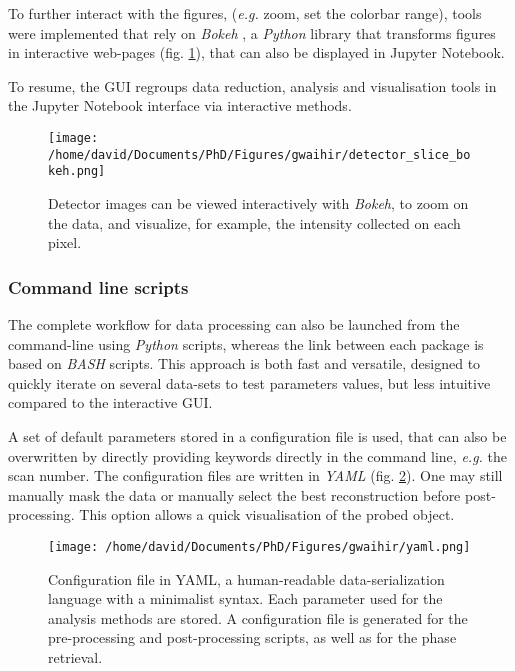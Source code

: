 To further interact with the figures, (\textit{e.g.} zoom, set the colorbar range), tools were implemented that rely on \textit{Bokeh} \parencite{Bokeh}, a \textit{Python} library that transforms figures in interactive web-pages (fig. \ref{fig:BokehDetector}), that can also be displayed in Jupyter Notebook.

To resume, the GUI regroups data reduction, analysis and visualisation tools in the Jupyter Notebook interface via interactive methods.

\begin{figure}[!htb]
    \centering
    \texttt{[image: /home/david/Documents/PhD/Figures/gwaihir/detector\_slice\_bokeh.png]}
    \caption{Detector images can be viewed interactively with \textit{Bokeh}, to zoom on the data, and visualize, for example, the intensity collected on each pixel.}
    \label{fig:BokehDetector}
\end{figure}

\subsubsection{Command line scripts}

The complete workflow for data processing can also be launched from the command-line using \textit{Python} scripts, whereas the link between each package is based on \textit{BASH} scripts.
This approach is both fast and versatile, designed to quickly iterate on several data-sets to test parameters values, but less intuitive compared to the interactive GUI.

A set of default parameters stored in a configuration file is used, that can also be overwritten by directly providing keywords directly in the command line, \textit{e.g.} the scan number.
The configuration files are written in \textit{YAML} (fig. \ref{fig:YAML_file}).
One may still manually mask the data or manually select the best reconstruction before post-processing.
This option allows a quick visualisation of the probed object.

\begin{figure}[!htb]
    \centering
    \texttt{[image: /home/david/Documents/PhD/Figures/gwaihir/yaml.png]}
    \caption{
    Configuration file in YAML, a human-readable data-serialization language with a minimalist syntax.
    Each parameter used for the analysis methods are stored.
    A configuration file is generated for the pre-processing and post-processing scripts, as well as for the phase retrieval.
    }
    \label{fig:YAML_file}
\end{figure}

